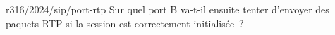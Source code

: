 \begin{question}{r316/2024/sip/port-rtp}
  Sur quel port B va-t-il ensuite tenter d'envoyer des paquets RTP
  si la session est correctement initialisée~?
  \begin{reponses}[3]
    \lastchoices
  \end{reponses}
\end{question}